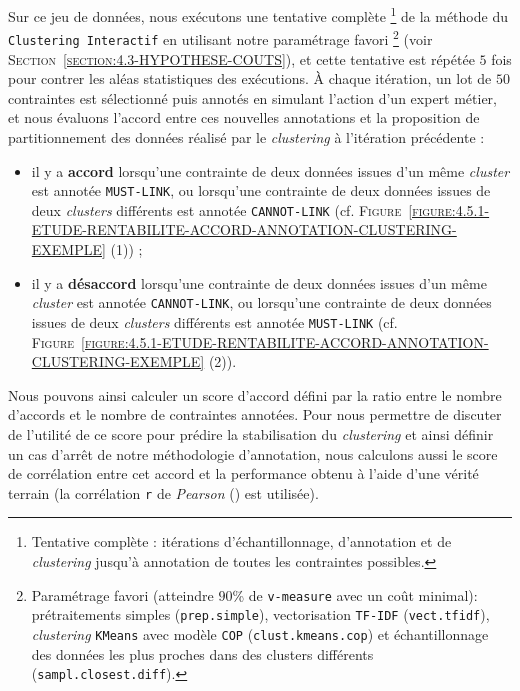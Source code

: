 			Sur ce jeu de données, nous exécutons une tentative complète \footnote{
				Tentative complète : itérations d'échantillonnage, d'annotation et de \textit{clustering} jusqu'à annotation de toutes les contraintes possibles.
			}
			de la méthode du \texttt{Clustering Interactif} en utilisant notre paramétrage favori \footnote{
				Paramétrage favori (atteindre $90$\% de \texttt{v-measure} avec un coût minimal): prétraitements simples (\texttt{prep.simple}), vectorisation \texttt{TF-IDF} (\texttt{vect.tfidf}), \textit{clustering} \texttt{KMeans} avec modèle \texttt{COP} (\texttt{clust.kmeans.cop}) et échantillonnage des données les plus proches dans des clusters différents (\texttt{sampl.closest.diff}).
			} (voir \textsc{Section~\ref{section:4.3-HYPOTHESE-COUTS}}), et cette tentative est répétée $5$ fois pour contrer les aléas statistiques des exécutions.
			À chaque itération, un lot de $50$ contraintes est sélectionné puis annotés en simulant l'action d'un expert métier, et nous évaluons l'accord entre ces nouvelles annotations et la proposition de partitionnement des données réalisé par le \textit{clustering} à l'itération précédente :
			\begin{itemize}
				\item il y a \textbf{accord} lorsqu'une contrainte de deux données issues d'un même \textit{cluster} est annotée \texttt{MUST-LINK}, ou lorsqu'une contrainte de deux données issues de deux \textit{clusters} différents est annotée \texttt{CANNOT-LINK} (cf. \textsc{Figure~\ref{figure:4.5.1-ETUDE-RENTABILITE-ACCORD-ANNOTATION-CLUSTERING-EXEMPLE} (1)}) ;
				\item il y a \textbf{désaccord} lorsqu'une contrainte de deux données issues d'un même \textit{cluster} est annotée \texttt{CANNOT-LINK}, ou lorsqu'une contrainte de deux données issues de deux \textit{clusters} différents est annotée \texttt{MUST-LINK} (cf. \textsc{Figure~\ref{figure:4.5.1-ETUDE-RENTABILITE-ACCORD-ANNOTATION-CLUSTERING-EXEMPLE} (2)}).
			\end{itemize}
			Nous pouvons ainsi calculer un score d'accord défini par la ratio entre le nombre d'accords et le nombre de contraintes annotées.
			Pour nous permettre de discuter de l'utilité de ce score pour prédire la stabilisation du \textit{clustering} et ainsi définir un cas d'arrêt de notre méthodologie d'annotation, nous calculons aussi le score de corrélation entre cet accord et la performance obtenu à l'aide d'une vérité terrain (la corrélation \texttt{r} de \textit{Pearson} (\cite{kirch:2008:pearson-correlation-coefficient}) est utilisée).

